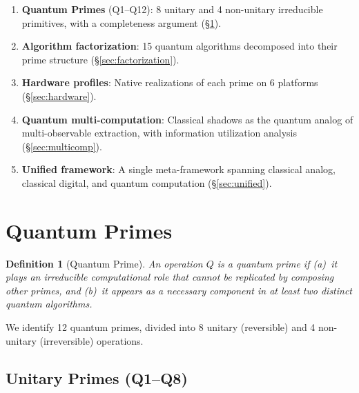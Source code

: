 \documentclass[11pt]{article}
\newtheorem{definition}{Definition}
\begin{document}
\begin{enumerate}[leftmargin=*]
\item \textbf{Quantum Primes} (Q1--Q12): 8 unitary and 4 non-unitary irreducible primitives, with a completeness argument (\S\ref{sec:primes}).
\item \textbf{Algorithm factorization}: 15 quantum algorithms decomposed into their prime structure (\S\ref{sec:factorization}).
\item \textbf{Hardware profiles}: Native realizations of each prime on 6 platforms (\S\ref{sec:hardware}).
\item \textbf{Quantum multi-computation}: Classical shadows as the quantum analog of multi-observable extraction, with information utilization analysis (\S\ref{sec:multicomp}).
\item \textbf{Unified framework}: A single meta-framework spanning classical analog, classical digital, and quantum computation (\S\ref{sec:unified}).
\end{enumerate}

\section{Quantum Primes}
\label{sec:primes}

\begin{definition}[Quantum Prime]
An operation $Q$ is a quantum prime if (a)~it plays an irreducible computational role that cannot be replicated by composing other primes, and (b)~it appears as a necessary component in at least two distinct quantum algorithms.
\end{definition}

We identify 12 quantum primes, divided into 8 unitary (reversible) and 4 non-unitary (irreversible) operations.

\subsection{Unitary Primes (Q1--Q8)}
\end{document}
